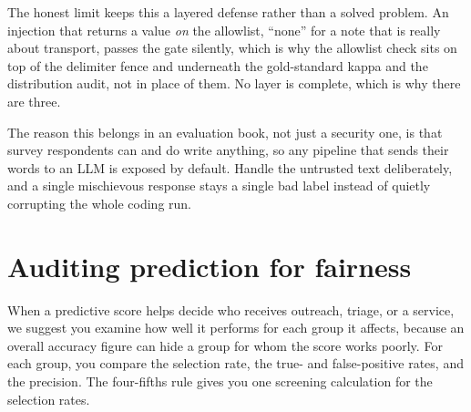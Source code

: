 The honest limit keeps this a layered defense rather than a solved problem. An injection that returns a value \emph{on} the allowlist, \enquote{none} for a note that is really about transport, passes the gate silently, which is why the allowlist check sits on top of the delimiter fence and underneath the gold-standard kappa and the distribution audit, not in place of them. No layer is complete, which is why there are three.

The reason this belongs in an evaluation book, not just a security one, is that survey respondents can and do write anything, so any pipeline that sends their words to an LLM is exposed by default. Handle the untrusted text deliberately, and a single mischievous response stays a single bad label instead of quietly corrupting the whole coding run.

\section{Auditing prediction for fairness}\label{sec:fairness}
When a predictive score helps decide who receives outreach, triage, or a service, we suggest you examine how well it performs for each group it affects, because an overall accuracy figure can hide a group for whom the score works poorly. For each group, you compare the selection rate, the true- and false-positive rates, and the precision. The four-fifths rule gives you one screening calculation for the selection rates.

